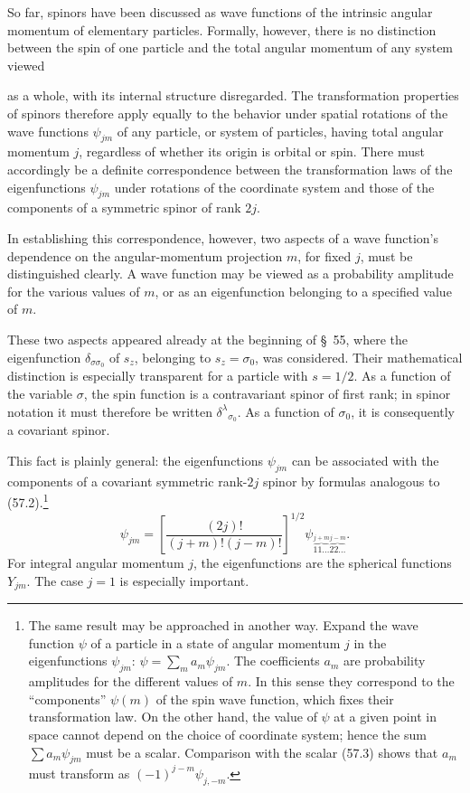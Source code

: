 So far, spinors have been discussed as wave functions of the intrinsic angular
momentum of elementary particles. Formally, however, there is no distinction
between the spin of one particle and the total angular momentum of any system
viewed

as a whole, with its internal structure disregarded. The transformation
properties of spinors therefore apply equally to the behavior under spatial
rotations of the wave functions $\psi_{jm}$ of any particle, or system of
particles, having total angular momentum $j$, regardless of whether its origin
is orbital or spin. There must accordingly be a definite correspondence
between the transformation laws of the eigenfunctions $\psi_{jm}$ under
rotations of the coordinate system and those of the components of a symmetric
spinor of rank $2j$.

In establishing this correspondence, however, two aspects of a wave
function's dependence on the angular-momentum projection $m$, for fixed $j$,
must be distinguished clearly. A wave function may be viewed as a probability
amplitude for the various values of $m$, or as an eigenfunction belonging to
a specified value of $m$.

These two aspects appeared already at the beginning of \S~55, where the
eigenfunction $\delta_{\sigma\sigma_0}$ of $s_z$, belonging to
$s_z=\sigma_0$, was considered. Their mathematical distinction is especially
transparent for a particle with $s=1/2$. As a function of the variable
$\sigma$, the spin function is a contravariant spinor of first rank; in spinor
notation it must therefore be written $\delta^\lambda{}_{\sigma_0}$. As a
function of $\sigma_0$, it is consequently a covariant spinor.

This fact is plainly general: the eigenfunctions $\psi_{jm}$ can be associated
with the components of a covariant symmetric rank-$2j$ spinor by formulas
analogous to (57.2).\footnote{The same result may be approached in another
way. Expand the wave function $\psi$ of a particle in a state of angular
momentum $j$ in the eigenfunctions $\psi_{jm}$:
$\psi=\sum_m a_m\psi_{jm}$. The coefficients $a_m$ are probability amplitudes
for the different values of $m$. In this sense they correspond to the
``components'' $\psi(m)$ of the spin wave function, which fixes their
transformation law. On the other hand, the value of $\psi$ at a given point
in space cannot depend on the choice of coordinate system; hence the sum
$\sum a_m\psi_{jm}$ must be a scalar. Comparison with the scalar (57.3) shows
that $a_m$ must transform as $(-1)^{j-m}\psi_{j,-m}$.}
\begin{equation}
 \psi_{jm}=\left[\frac{(2j)!}{(j+m)!(j-m)!}\right]^{1/2}
 \psi_{\overbrace{11\ldots}^{j+m}\overbrace{22\ldots}^{j-m}}.
 \tag{57.6}
\end{equation}
For integral angular momentum $j$, the eigenfunctions are the spherical
functions $Y_{jm}$. The case $j=1$ is especially important.


